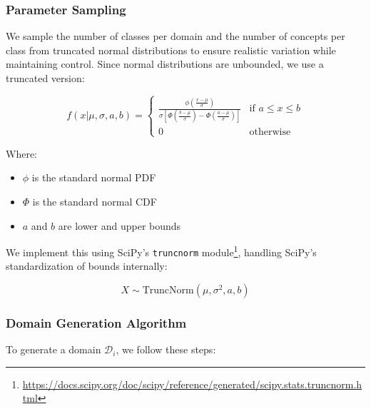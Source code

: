 \subsubsection{Parameter Sampling}

We sample the number of classes per domain and the number of concepts per class from truncated normal distributions to ensure realistic variation while maintaining control. Since normal distributions are unbounded, we use a truncated version:

\begin{equation*}
    f(x|\mu, \sigma, a, b) =
    \begin{cases}
        \frac{\phi\left(\frac{x-\mu}{\sigma}\right)}{\sigma\left[\Phi\left(\frac{b-\mu}{\sigma}\right) - \Phi\left(\frac{a-\mu}{\sigma}\right)\right]} & \text{if } a \leq x \leq b \\
        0                                                                                                                                              & \text{otherwise}
    \end{cases}
\end{equation*}

Where:
\begin{itemize}
    \item $\phi$ is the standard normal PDF
    \item $\Phi$ is the standard normal CDF
    \item $a$ and $b$ are lower and upper bounds
\end{itemize}

We implement this using SciPy's \texttt{truncnorm} module\footnote{\url{https://docs.scipy.org/doc/scipy/reference/generated/scipy.stats.truncnorm.html}},
handling SciPy's standardization of bounds internally:

\begin{equation*}
    X \sim \text{TruncNorm}(\mu, \sigma^2, a, b)
\end{equation*}

\subsubsection{Domain Generation Algorithm}

To generate a domain $\mathcal{D}_i$, we follow these steps:

